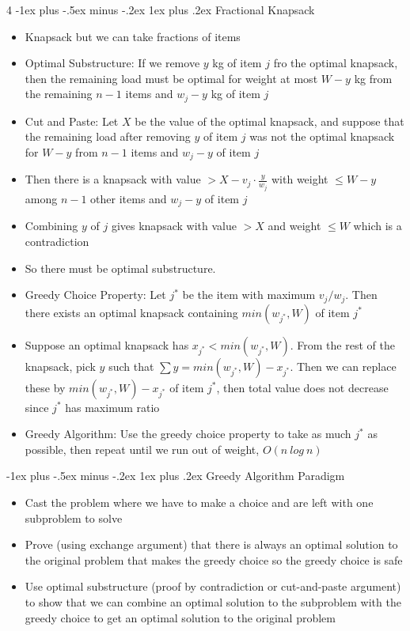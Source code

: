 \documentclass[10pt, landscape]{article}
\makeatletter
\renewcommand{\subsection}{\@startsection{subsection}{3}{0mm}%
                                {-1ex plus -.5ex minus -.2ex}%
                                {1ex plus .2ex}%
                                {\normalfont\small\bfseries}}%
\makeatother
\begin{document}
\begin{multicols*}{4}
\subsection{Fractional Knapsack}
\begin{itemize}
    \item Knapsack but we can take fractions of items
    \item Optimal Substructure: If we remove $y$ kg of item $j$ fro the optimal knapsack, then the remaining load must be optimal for weight at most $W-y$ kg from the remaining $n-1$ items and $w_j-y$ kg of item $j$
    \item Cut and Paste: Let $X$ be the value of the optimal knapsack, and suppose that the remaining load after removing $y$ of item $j$ was not the optimal knapsack for $W-y$ from $n-1$ items and $w_j-y$ of item $j$
    \item Then there is a knapsack with value $> X-v_j\cdot \frac{y}{w_j}$ with weight $\leq W-y$ among $n-1$ other items and $w_j-y$ of item $j$
    \item Combining $y$ of $j$ gives knapsack with value $>X$ and weight $\leq W$ which is a contradiction
    \item So there must be optimal substructure.
    \item Greedy Choice Property: Let $j^*$ be the item with maximum $v_j/w_j$. Then there exists an optimal knapsack containing $min(w_{j^*}, W)$ of item $j^*$
    \item Suppose an optimal knapsack has $x_{j^*} < min(w_{j^*}, W)$. From the rest of the knapsack, pick $y$ such that $\sum y=min(w_{j^*}, W)-x_{j^*}$. Then we can replace these by $min(w_{j^*}, W)-x_{j^*}$ of item $j^*$, then total value does not decrease since $j^*$ has maximum ratio
    \item Greedy Algorithm: Use the greedy choice property to take as much $j^*$ as possible, then repeat until we run out of weight, $O(n\ log\ n)$
\end{itemize}

\subsection{Greedy Algorithm Paradigm}
\begin{itemize}
    \item Cast the problem where we have to make a choice and are left with one subproblem to solve
    \item Prove (using exchange argument) that there is always an optimal solution to the original problem that makes the greedy choice so the greedy choice is safe
    \item Use optimal substructure (proof by contradiction or cut-and-paste argument) to show that we can combine an optimal solution to the subproblem with the greedy choice to get an optimal solution to the original problem
\end{itemize}


\end{multicols*}
\end{document}
